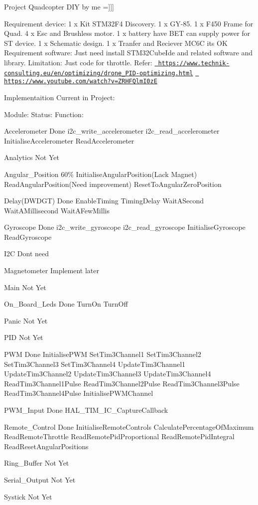Project Quadcopter D\+IY by me =\mbox{]}\mbox{]}\mbox{]}

Requirement device\+: 1 x Kit S\+T\+M32\+F4 Discovery. 1 x G\+Y-\/85. 1 x F450 Frame for Quad. 4 x Esc and Brushless motor. 1 x battery have B\+ET can supply power for ST device. 1 x Schematic design. 1 x Tranfer and Reciever M\+C6C it\textquotesingle{}s OK Requirement software\+: Just need install S\+T\+M32\+Cube\+Ide and related software and library. Limitation\+: Just code for throttle. Refer\+: \href{https://www.technik-consulting.eu/en/optimizing/drone_PID-optimizing.html}{\texttt{ https\+://www.\+technik-\/consulting.\+eu/en/optimizing/drone\+\_\+\+P\+I\+D-\/optimizing.\+html}} \href{https://www.youtube.com/watch?v=ZRHFQlmI0zE}{\texttt{ https\+://www.\+youtube.\+com/watch?v=\+Z\+R\+H\+F\+Qlm\+I0zE}}

Implementaition Current in Project\+:
\begin{DoxyItemize}
\item Module\+: Status\+: Function\+:
\item Accelerometer Done i2c\+\_\+write\+\_\+accelerometer i2c\+\_\+read\+\_\+accelerometer Initialise\+Accelerometer Read\+Accelerometer
\item Analytics Not Yet
\item Angular\+\_\+\+Position 60\% Initialise\+Angular\+Position(\+Lack Magnet) Read\+Angular\+Position(\+Need improvement) Reset\+To\+Angular\+Zero\+Position
\item Delay(\+D\+W\+D\+G\+T) Done Enable\+Timing Timing\+Delay Wait\+A\+Second Wait\+A\+Millisecond Wait\+A\+Few\+Millis
\item Gyroscope Done i2c\+\_\+write\+\_\+gyroscope i2c\+\_\+read\+\_\+gyroscope Initialise\+Gyroscope Read\+Gyroscope
\item I2C Don\textquotesingle{}t need
\item Magnetometer Implement later
\item Main Not Yet
\item On\+\_\+\+Board\+\_\+\+Leds Done Turn\+On Turn\+Off
\item Panic Not Yet
\item P\+ID Not Yet
\item P\+WM Done Initialise\+P\+WM Set\+Tim3\+Channel1 Set\+Tim3\+Channel2 Set\+Tim3\+Channel3 Set\+Tim3\+Channel4 Update\+Tim3\+Channel1 Update\+Tim3\+Channel2 Update\+Tim3\+Channel3 Update\+Tim3\+Channel4 Read\+Tim3\+Channel1\+Pulse Read\+Tim3\+Channel2\+Pulse Read\+Tim3\+Channel3\+Pulse Read\+Tim3\+Channel4\+Pulse Initialise\+P\+W\+M\+Channel
\item P\+W\+M\+\_\+\+Input Done H\+A\+L\+\_\+\+T\+I\+M\+\_\+\+I\+C\+\_\+\+Capture\+Callback
\item Remote\+\_\+\+Control Done Initialise\+Remote\+Controls Calculate\+Percentage\+Of\+Maximum Read\+Remote\+Throttle Read\+Remote\+Pid\+Proportional Read\+Remote\+Pid\+Integral Read\+Reset\+Angular\+Positions
\item Ring\+\_\+\+Buffer Not Yet
\item Serial\+\_\+\+Output Not Yet
\item Systick Not Yet 
\end{DoxyItemize}